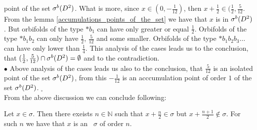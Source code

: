 point of the set ${\mathcal{\sigma}^b(D^2)}$. What is more, since $x\in (0, -\frac{1}{12})$, then $x+\frac{1}{2} 
\in (\frac{1}{2}, \frac{5}{12}$. From the lemma \ref{accumulations_points_of_the_set} we 
have that $x$ is in ${\mathcal{\sigma}^b(D^2)}$. But orbifolds of the type $*b_1$ can have \Eoc only greater or 
equal $\frac{1}{2}$. Orbifolds of the type $*b_1b_2$ can only have \Eoc $\frac{1}{2}$, 
$\frac{5}{12}$ and some smaller. Orbifolds of the type $*b_1b_2b_3\dots$ can have \Eoc only 
lower than $\frac{1}{4}$. This analysis of the cases leads us to the conclusion, that 
$(\frac{1}{2},\frac{5}{12})\cap {\mathcal{\sigma}^b(D^2)}=\emptyset$ and to the contradiction. \\
$\bullet$ Above analysis of the cases leads us also to the conclusion, that $\frac{5}{12}$ 
is 
an isolated point of the set ${\mathcal{\sigma}^b(D^2)}$, from this $-\frac{1}{12}$ is an acccumulation point 
of order $1$ of the set ${\mathcal{\sigma}^b(D^2)}$. $_\square$ \\

From the above discussion we can conclude following: 
\begin{corollary}\label{predescors}
Let $x \in \sigma$. Then there exeists $n \in \mathbb{N}$ such that $x + \frac{n}{2} \in \sigma$ 
but $x+\frac{n+1}{2} \not\in \sigma$. For such $n$ we have that $x$ is an \apots\ $\sigma$ of 
order $n$.  
\end{corollary}



 
 








